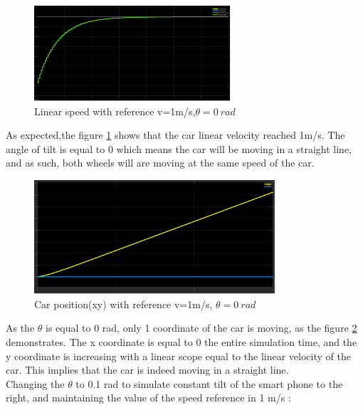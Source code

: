 \begin{figure}[!h]
\centering
\includegraphics[width=0.65\textwidth]{./img/vel10.png}
\caption {\label{fig:sim1 - vel}Linear speed with reference v=1m/s,$\theta = 0~\si{rad}$}
\end{figure}
 As expected,the figure \ref{fig:sim1 - vel} shows that the car linear velocity reached 1m/s. The angle of tilt is equal to 0 which means the car will be moving in a straight line, and as such, both wheels will are moving at the same speed of the car.\\
\newpage
\begin{figure}[!h]
\centering
\includegraphics[width=0.8\textwidth]{./img/xy10.png}
\caption {\label{fig:sim1 - pos}Car position(xy) with reference v=1m/s, $\theta = 0~\si{rad}$}
\end{figure}
As the $\theta$ is equal to 0 rad, only 1 coordinate of the car is moving, as the figure \ref{fig:sim1 - pos} demonstrates. The x coordinate is equal to 0 the entire simulation time, and the y coordinate is increasing with a linear scope equal to the linear velocity of the car. This implies that the car is indeed moving in a straight line.\\
Changing the $\theta$ to 0.1 rad to simulate constant tilt of the smart phone to the right, and maintaining the value of the speed reference in 1 m/s :\


